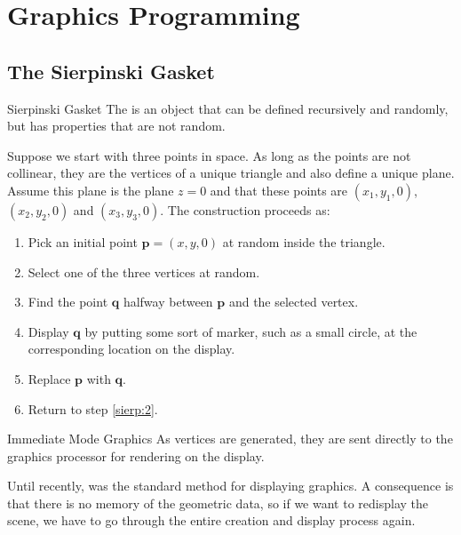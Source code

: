\documentclass[../notes.tex]{subfiles}
\begin{document}
  \setcounter{chapter}{1}
  \chapter{Graphics Programming}
    \section{The Sierpinski Gasket}
      \begin{definition}{Sierpinski Gasket}
        The  is an object that can be defined recursively and randomly,
        but has properties that are not random.

        Suppose we start with three points in space.
        As long as the points are not collinear, they are the vertices of a unique triangle
        and also define a unique plane.
        Assume this plane is the plane $z = 0$ and that these points are $(x_1, y_1, 0)$,
        $(x_2, y_2, 0)$ and $(x_3, y_3, 0)$.
        The construction proceeds as:
        \begin{enumerate}
          \item Pick an initial point $\mathbf{p} = (x, y, 0)$ at random inside the triangle.
          \item \label{sierp:2} Select one of the three vertices at random.
          \item Find the point $\mathbf{q}$ halfway between $\mathbf{p}$ and the selected vertex.
          \item Display $\mathbf{q}$ by putting some sort of marker,
            such as a small circle,
            at the corresponding location on the display.
          \item Replace $\mathbf{p}$ with $\mathbf{q}$.
          \item Return to step \ref{sierp:2}.
        \end{enumerate}
      \end{definition}

      \begin{definition}{Immediate Mode Graphics}
        As vertices are generated, they are sent directly to the graphics processor
        for rendering on the display.

        Until recently, was the standard method for displaying graphics.
        A consequence is that there is no memory of the geometric data,
        so if we want to redisplay the scene, we have to go through the entire creation
        and display process again.
      \end{definition}
\end{document}
